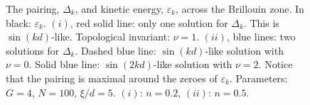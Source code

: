 \begin{figure}
\begin{center}

\caption{The pairing, $\Delta_k$, and kinetic energy, $\varepsilon_k$, across the Brillouin zone. In black: $\varepsilon_k$. $(i)$, red solid line: only one solution for $\Delta_k$. This is $\sin(kd)$-like. Topological invariant: $\nu = 1$. $(ii)$, blue lines: two solutions for $\Delta_k$. Dashed blue line: $\sin(kd)$-like solution with $\nu = 0$. Solid blue line: $\sin(2kd)$-like solution with $\nu = 2$. Notice that the pairing is maximal around the zeroes of $\varepsilon_k$. Parameters: $G = 4$, $N = 100$, $\xi / d = 5$. $(i)$: $n = 0.2$, $(ii)$: $n = 0.5$.}
\label{fig.Deltaexamples.t21.0}
\end{center}
\end{figure}

